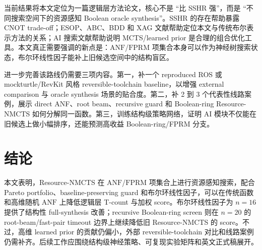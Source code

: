 \documentclass[UTF8,fontset=macnew,11pt]{ctexart}
\newcommand{\method}{Resource-NMCTS}
\newcommand{\anf}{\ensuremath{\mathrm{ANF}}}
\newcommand{\fprm}{\ensuremath{\mathrm{FPRM}}}
\begin{document}
当前结果将本文定位为一篇逻辑层方法论文，核心不是 ``比 SSHR 强''，而是 ``不同搜索空间下的资源感知 Boolean oracle synthesis''。SSHR 的存在帮助暴露 CNOT trade-off；ESOP、ABC、BDD 和 XAG 文献帮助定位本文与传统布尔表示方法的关系；AI 搜索文献帮助说明 MCTS/learned prior 是合理的组合优化工具。本文真正需要强调的新点是：\anf{}/\fprm{} 项集合本身可以作为神经树搜索状态，布尔环线性因子能补上旧候选空间中的结构盲区。

进一步完善该路线仍需要三项内容。第一，补一个 reproduced ROS 或 mockturtle/RevKit 风格 reversible-toolchain baseline，以增强 external comparison 与 oracle synthesis 场景的贴合度。第二，补 2 到 3 个代表性线路案例，展示 direct ANF、root beam、recursive guard 和 Boolean-ring \method{} 如何分解同一函数。第三，训练结构级策略网络，证明 AI 模块不仅能在旧候选上做小幅排序，还能预测高收益 Boolean-ring/FPRM 分支。

\section{结论}

本文表明，\method{} 在 \anf{}/\fprm{} 项集合上进行资源感知搜索，配合 Pareto portfolio、baseline-preserving guard 和布尔环线性因子，可以在传统函数和高维随机 \anf{} 上降低逻辑层 T-count 与加权 score。布尔环线性因子为 $n=16$ 提供了结构性 full-synthesis 改善；recursive Boolean-ring screen 则在 $n=20$ 的 root-beam/fast-pair timeout 边界上继续降低旧 \method{} 的 score。不过，高维 learned prior 的贡献仍偏小，外部 reversible-toolchain 对比和线路案例仍需补齐。后续工作应围绕结构级神经策略、可复现实验矩阵和英文正式稿展开。
\end{document}
